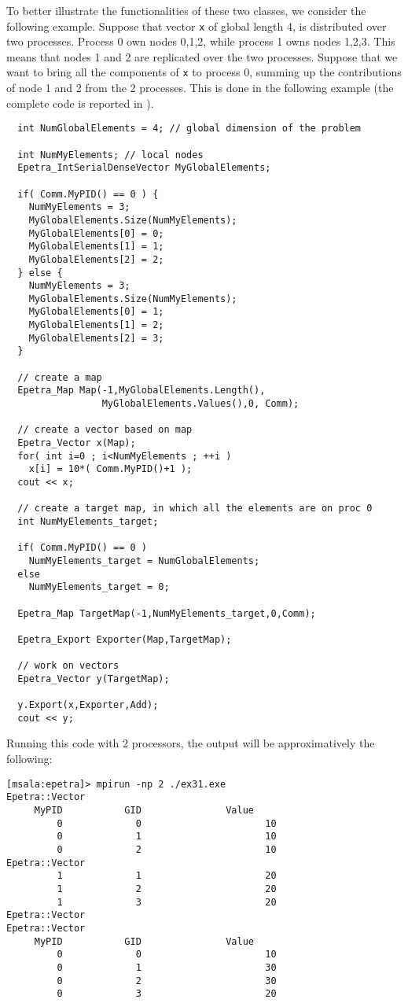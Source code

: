To better illustrate the functionalities of these two classes, we
consider the following example. Suppose that vector \verb!x! of global
length 4, is distributed over two processes. Process 0 own nodes 0,1,2,
while process 1 owns nodes 1,2,3. This means that nodes 1 and 2 are
replicated over the two processes. Suppose that we want to bring all the
components of \verb!x! to process 0, summing up the contributions of
node 1 and 2 from the 2 processes. This is done in the following example
(the complete code is reported in ).
\begin{verbatim}
  int NumGlobalElements = 4; // global dimension of the problem

  int NumMyElements; // local nodes
  Epetra_IntSerialDenseVector MyGlobalElements;

  if( Comm.MyPID() == 0 ) {
    NumMyElements = 3;
    MyGlobalElements.Size(NumMyElements);
    MyGlobalElements[0] = 0;
    MyGlobalElements[1] = 1;
    MyGlobalElements[2] = 2;
  } else {
    NumMyElements = 3;
    MyGlobalElements.Size(NumMyElements);
    MyGlobalElements[0] = 1;
    MyGlobalElements[1] = 2;
    MyGlobalElements[2] = 3;
  }

  // create a map
  Epetra_Map Map(-1,MyGlobalElements.Length(),
                 MyGlobalElements.Values(),0, Comm);

  // create a vector based on map
  Epetra_Vector x(Map);
  for( int i=0 ; i<NumMyElements ; ++i )
    x[i] = 10*( Comm.MyPID()+1 );
  cout << x;

  // create a target map, in which all the elements are on proc 0
  int NumMyElements_target;

  if( Comm.MyPID() == 0 )
    NumMyElements_target = NumGlobalElements;
  else
    NumMyElements_target = 0;

  Epetra_Map TargetMap(-1,NumMyElements_target,0,Comm);

  Epetra_Export Exporter(Map,TargetMap);

  // work on vectors
  Epetra_Vector y(TargetMap);

  y.Export(x,Exporter,Add);
  cout << y;
\end{verbatim}

Running this code with 2 processors, the output will be approximatively
the following:
\begin{verbatim}
[msala:epetra]> mpirun -np 2 ./ex31.exe
Epetra::Vector
     MyPID           GID               Value
         0             0                      10
         0             1                      10
         0             2                      10
Epetra::Vector
         1             1                      20
         1             2                      20
         1             3                      20
Epetra::Vector
Epetra::Vector
     MyPID           GID               Value
         0             0                      10
         0             1                      30
         0             2                      30
         0             3                      20
\end{verbatim}


